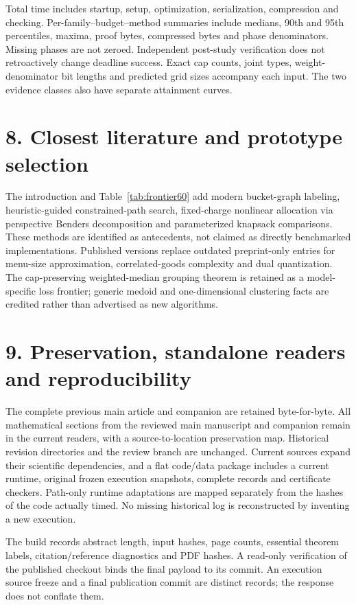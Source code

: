 Total time includes startup, setup, optimization, serialization, compression and checking. Per-family--budget--method summaries include medians, 90th and 95th percentiles, maxima, proof bytes, compressed bytes and phase denominators. Missing phases are not zeroed. Independent post-study verification does not retroactively change deadline success. Exact cap counts, joint types, weight-denominator bit lengths and predicted grid sizes accompany each input. The two evidence classes also have separate attainment curves.

\section*{8. Closest literature and prototype selection}
The introduction and Table~\ref{tab:frontier60} add modern bucket-graph labeling, heuristic-guided constrained-path search, fixed-charge nonlinear allocation via perspective Benders decomposition and parameterized knapsack comparisons. These methods are identified as antecedents, not claimed as directly benchmarked implementations. Published versions replace outdated preprint-only entries for menu-size approximation, correlated-goods complexity and dual quantization. The cap-preserving weighted-median grouping theorem is retained as a model-specific loss frontier; generic medoid and one-dimensional clustering facts are credited rather than advertised as new algorithms.

\section*{9. Preservation, standalone readers and reproducibility}
The complete previous main article and companion are retained byte-for-byte. All mathematical sections from the reviewed main manuscript and companion remain in the current readers, with a source-to-location preservation map. Historical revision directories and the review branch are unchanged. Current sources expand their scientific dependencies, and a flat code/data package includes a current runtime, original frozen execution snapshots, complete records and certificate checkers. Path-only runtime adaptations are mapped separately from the hashes of the code actually timed. No missing historical log is reconstructed by inventing a new execution.

The build records abstract length, input hashes, page counts, essential theorem labels, citation/reference diagnostics and PDF hashes. A read-only verification of the published checkout binds the final payload to its commit. An execution source freeze and a final publication commit are distinct records; the response does not conflate them.

